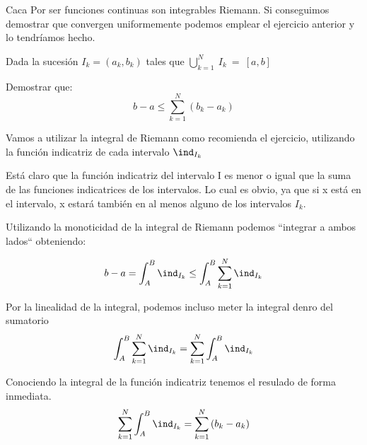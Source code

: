 \begin{problem}[Ejercicio 6]

Caca 
\solution
Por ser funciones continuas son integrables Riemann. Si conseguimos demostrar que convergen uniformemente podemos emplear el ejercicio anterior y lo tendríamos hecho.
\end{problem}

\begin{problem}[Ejercicio 7]
Dada la sucesión $I_k = (a_k, b_k)$ tales que $\bigcup_{k=1}^{N}~I_k~=~[a,b]$

Demostrar que:
\[b-a \leq \sum_{k=1}^N (b_k - a_k)\]

\solution
Vamos a utilizar la integral de Riemann como recomienda el ejercicio, utilizando la función indicatriz de cada intervalo $\ind_{I_k}$

Está claro que la función indicatriz del intervalo I es menor o igual que la suma de las funciones indicatrices de los intervalos. Lo cual es obvio, ya que si x está en el intervalo, x estará también en al menos alguno de los intervalos $I_k$.

Utilizando la monoticidad de la integral de Riemann podemos ``integrar a ambos lados`` obteniendo:

\[ b-a = \int_{A}^{B} \ind_{I_k} \leq \int_{A}^{B} \sum_{k=1}^{N} \ind_{I_k}\]

Por la linealidad de la integral, podemos incluso meter la integral denro del sumatorio
\[\int_{A}^{B} \sum_{k=1}^{N} \ind_{I_k} = \sum_{k=1}^{N} \int_{A}^{B} \ind_{I_k}\]


Conociendo la integral de la función indicatriz tenemos el resulado de forma inmediata.
\[\sum_{k=1}^{N} \int_{A}^{B} \ind_{I_k} = \sum_{k=1}^{N} \left( b_k - a_k \right)\]

\end{problem}